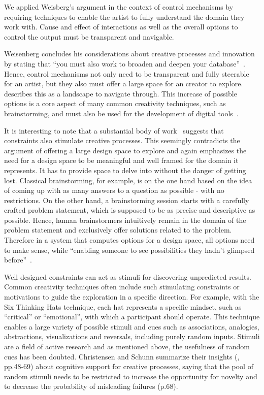 We applied Weisberg's argument in the context of control mechanisms by requiring techniques to enable the artist to fully understand the domain they work with. Cause and effect of interactions as well as the overall options to control the output must be transparent and navigable.

Weisenberg concludes his considerations about creative processes and innovation by stating that ``you must also work to broaden and deepen your database''~\cite{markman_2009_tis}. Hence, control mechanisms not only need to be transparent and fully steerable for an artist, but they also must offer a large space for an creator to explore. \citeauthor*{boden_2010_cat}~\cite{boden_2010_cat} describes this as a landscape to navigate through. This increase of possible options is a core aspect of many common creativity techniques, such as brainstorming, and must also be used for the development of digital tools~\cite{terry_2004_vea}.

It is interesting to note that a substantial body of work~\cite{onarheim_2010_occ,shih_2011_buc,biskjaer_2014_cud,stokes_2005_ccp} suggests that constraints also stimulate creative processes. This seemingly contradicts the argument of offering a large design space to explore and again emphasizes the need for a design space to be meaningful and well framed for the domain it represents. It has to provide space to delve into without the danger of getting lost. Classical brainstorming, for example, is on the one hand based on the idea of coming up with as many answers to a question as possible - with no restrictions. On the other hand, a brainstorming session starts with a carefully crafted problem statement, which is supposed to be as precise and descriptive as possible. Hence, human brainstormers intuitively remain in the domain of the problem statement and exclusively offer solutions related to the problem. Therefore in a system that computes options for a design space, all options need to make sense, while ``enabling someone to see possibilities they hadn't glimpsed before''~\cite{boden_2010_cat}. 

Well designed constraints can act as stimuli for discovering unpredicted results. Common creativity techniques often include such stimulating constraints or motivations to guide the exploration in a specific direction. For example, with the Six Thinking Hats technique, each hat represents a specific mindset, such as “critical” or “emotional”, with which a participant should operate. This technique enables a large variety of possible stimuli and cues such as associations, analogies, abstractions, visualizations and reversals, including purely random inputs. Stimuli are a field of active research and as mentioned above, the usefulness of random cues has been doubted. Christensen and Schunn summarize their insights (\cite{markman_2009_tis}, pp.48-69) about cognitive support for creative processes, saying that the pool of random stimuli needs to be restricted to increase the opportunity for novelty and to decrease the probability of misleading failures (p.68).

